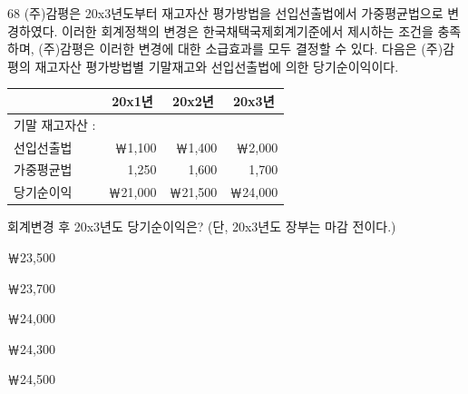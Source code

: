 \begin{question}{68}
(주)감평은 20x3년도부터 재고자산 평가방법을 선입선출법에서 가중평균법으로 변경하였다. 이러한 회계정책의 변경은 한국채택국제회계기준에서 제시하는 조건을 충족하며, (주)감평은 이러한 변경에 대한 소급효과를 모두 결정할 수 있다. 다음은 (주)감평의 재고자산 평가방법별 기말재고와 선입선출법에 의한 당기순이익이다.
\par{\small\centering
\begin{tabular}{|l|r|r|r|}
\hline
 & \multicolumn{1}{c|}{20x1년} & \multicolumn{1}{c|}{20x2년} & \multicolumn{1}{c|}{20x3년} \\ \hline
기말 재고자산 : & & & \\
\hspace{2em}선입선출법 & ￦1,100 & ￦1,400 & ￦2,000 \\
\hspace{2em}가중평균법 & 1,250 & 1,600 & 1,700 \\ \hline
당기순이익 & ￦21,000 & ￦21,500 & ￦24,000 \\ \hline
\end{tabular}\par}
회계변경 후 20x3년도 당기순이익은? (단, 20x3년도 장부는 마감 전이다.) \par
\begin{choices}
  \item ￦23,500
  \item ￦23,700
  \item ￦24,000
  \item ￦24,300
  \item ￦24,500
\end{choices}
\end{question}
